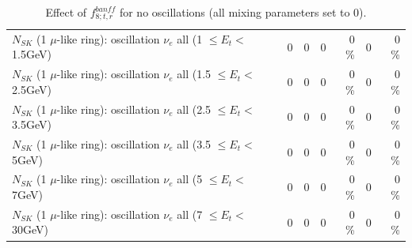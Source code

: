 \begin{table}
\begin{tabular}{| l | r | r | r  r | r  r |}
$N_{SK}$ (1 $\mu$-like ring): oscillation $\nu_{e}$ all (1 $\leq E_{t} <$ 1.5GeV) &               0 &               0 &               0 &        0 \%  &               0 &        0 \%  \\ 
$N_{SK}$ (1 $\mu$-like ring): oscillation $\nu_{e}$ all (1.5 $\leq E_{t} <$ 2.5GeV) &               0 &               0 &               0 &        0 \%  &               0 &        0 \%  \\ 
$N_{SK}$ (1 $\mu$-like ring): oscillation $\nu_{e}$ all (2.5 $\leq E_{t} <$ 3.5GeV) &               0 &               0 &               0 &        0 \%  &               0 &        0 \%  \\ 
$N_{SK}$ (1 $\mu$-like ring): oscillation $\nu_{e}$ all (3.5 $\leq E_{t} <$ 5GeV) &               0 &               0 &               0 &        0 \%  &               0 &        0 \%  \\ 
 $N_{SK}$ (1 $\mu$-like ring): oscillation $\nu_{e}$ all (5 $\leq E_{t} <$ 7GeV) &               0 &               0 &               0 &        0 \%  &               0 &        0 \%  \\ 
$N_{SK}$ (1 $\mu$-like ring): oscillation $\nu_{e}$ all (7 $\leq E_{t} <$ 30GeV) &               0 &               0 &               0 &        0 \%  &               0 &        0 \%  \\ 
\hline
\hline
\end{tabular}
\caption{ Effect of $f_{8; t, r}^{banff}$ for no oscillations (all mixing parameters set to 0). }
\label{tab:num_banff_08_1RmuT_3f_osc_t13:0}
\end{table}
\clearpage
